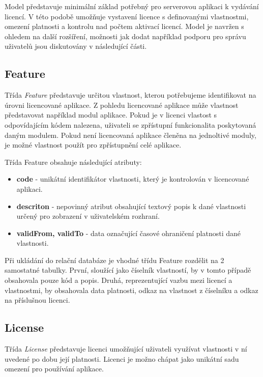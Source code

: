 Model představuje minimální základ potřebný pro serverovou aplikaci k vydávání
licencí. V této podobě umožňuje vystavení licence s definovanými vlastnostmi,
omezení platnosti a kontrolu nad počtem aktivací licencí. Model je navržen s
ohledem na další rozšíření, možnosti jak dodat například podporu pro správu
uživatelů jsou diskutovány v následující části.


\subsection*{Feature}

Třída \textit{Feature} představuje určitou vlastnost, kterou potřebujeme
identifikovat na úrovni licencované aplikace. Z pohledu licencované aplikace může vlastnost
představovat například modul aplikace. Pokud je v licenci vlastost s
odpovídajícím kódem nalezena, uživateli se zpřístupní funkcionalita poskytovaná
daným modulem. Pokud není licencovaná aplikace členěna na jednoltivé moduly, je
možné vlastnost použít pro zpřístupnění celé aplikace.

Třída Feature obsahuje následující atributy:

\begin{itemize}
  \item \textbf{code} - unikátní identifikátor vlastnosti, který je kontrolován
  v licencované aplikaci.
  \item \textbf{descriton} - nepovinný atribut obsahující textový popis k dané
  vlastnosti určený pro zobrazení v uživatelském rozhraní.
  \item \textbf{validFrom, validTo} - data označující časové ohraničení
  platnosti dané vlastnosti.
\end{itemize}

Při ukládání do relační databáze je vhodné třídu Feature rozdělit na 2
samostatné tabulky. První, sloužící jako číselník vlastností, by v tomto případě
obsahovala pouze kód a popis. Druhá, reprezentující vazbu mezi
licencí a vlastnostmi, by obsahovala data platnosti, odkaz na vlastnost z
číselníku a odkaz na příslušnou licenci. 

\subsection*{License}

Třída \textit{License} představuje licenci umožňující uživateli využívat
vlastnosti v ní uvedené po dobu její platnosti. Licenci je možno chápat jako unikátní sadu
omezení pro používání aplikace. 

